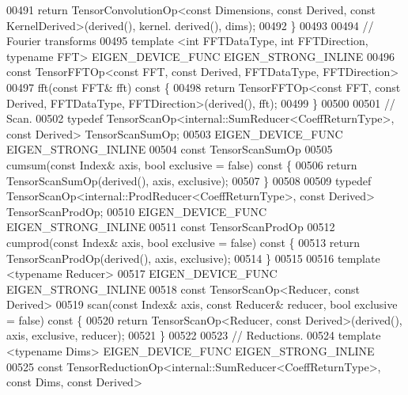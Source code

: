 \begin{DoxyCode}
00491       \textcolor{keywordflow}{return} TensorConvolutionOp<const Dimensions, const Derived, const KernelDerived>(derived(), kernel.
      derived(), dims);
00492     \}
00493 
00494     \textcolor{comment}{// Fourier transforms}
00495     \textcolor{keyword}{template} <\textcolor{keywordtype}{int} FFTDataType, \textcolor{keywordtype}{int} FFTDirection, \textcolor{keyword}{typename} FFT> EIGEN\_DEVICE\_FUNC EIGEN\_STRONG\_INLINE
00496     \textcolor{keyword}{const} TensorFFTOp<const FFT, const Derived, FFTDataType, FFTDirection>
00497     fft(\textcolor{keyword}{const} FFT& fft)\textcolor{keyword}{ const }\{
00498       \textcolor{keywordflow}{return} TensorFFTOp<const FFT, const Derived, FFTDataType, FFTDirection>(derived(), fft);
00499     \}
00500 
00501     \textcolor{comment}{// Scan.}
00502     \textcolor{keyword}{typedef} TensorScanOp<internal::SumReducer<CoeffReturnType>, \textcolor{keyword}{const} Derived> TensorScanSumOp;
00503     EIGEN\_DEVICE\_FUNC EIGEN\_STRONG\_INLINE
00504     \textcolor{keyword}{const} TensorScanSumOp
00505     cumsum(\textcolor{keyword}{const} Index& axis, \textcolor{keywordtype}{bool} exclusive = \textcolor{keyword}{false})\textcolor{keyword}{ const }\{
00506       \textcolor{keywordflow}{return} TensorScanSumOp(derived(), axis, exclusive);
00507     \}
00508 
00509     \textcolor{keyword}{typedef} TensorScanOp<internal::ProdReducer<CoeffReturnType>, \textcolor{keyword}{const} Derived> TensorScanProdOp;
00510     EIGEN\_DEVICE\_FUNC EIGEN\_STRONG\_INLINE
00511     \textcolor{keyword}{const} TensorScanProdOp
00512     cumprod(\textcolor{keyword}{const} Index& axis, \textcolor{keywordtype}{bool} exclusive = \textcolor{keyword}{false})\textcolor{keyword}{ const }\{
00513       \textcolor{keywordflow}{return} TensorScanProdOp(derived(), axis, exclusive);
00514     \}
00515 
00516     \textcolor{keyword}{template} <\textcolor{keyword}{typename} Reducer>
00517     EIGEN\_DEVICE\_FUNC EIGEN\_STRONG\_INLINE
00518     \textcolor{keyword}{const} TensorScanOp<Reducer, const Derived>
00519     scan(\textcolor{keyword}{const} Index& axis, \textcolor{keyword}{const} Reducer& reducer, \textcolor{keywordtype}{bool} exclusive = \textcolor{keyword}{false})\textcolor{keyword}{ const }\{
00520       \textcolor{keywordflow}{return} TensorScanOp<Reducer, const Derived>(derived(), axis, exclusive, reducer);
00521     \}
00522 
00523     \textcolor{comment}{// Reductions.}
00524     \textcolor{keyword}{template} <\textcolor{keyword}{typename} Dims> EIGEN\_DEVICE\_FUNC EIGEN\_STRONG\_INLINE
00525     \textcolor{keyword}{const} TensorReductionOp<internal::SumReducer<CoeffReturnType>, \textcolor{keyword}{const} Dims, \textcolor{keyword}{const} Derived>

\end{DoxyCode}
